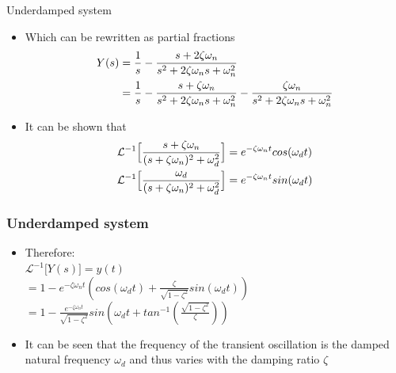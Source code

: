 \begin{frame}{Underdamped system}
\begin{itemize}
\item Which can be rewritten as partial fractions\\
\vspace{-0.5cm}
\begin{align*}
Y(s)&=\frac{1}{s} -\frac{s+2\zeta\omega_n}{s^2+2\zeta\omega_n s+ \omega_n ^2} \\ \vspace{2cm}
&= \frac{1}{s} -\frac{s+\zeta\omega_n}{s^2+2\zeta\omega_n s+ \omega_n ^2} -\frac{\zeta\omega_n}{s^2+2\zeta\omega_n s+ \omega_n ^2}
\end{align*}
\item It can be shown that
\\ 
\begin{align*}
\mathcal{L}^{-1}\Big[\frac{s+\zeta\omega_n}{(s+\zeta\omega_n)^2+\omega_d ^2}\Big]&= e^{-\zeta\omega_n t}cos(\omega_d t)\\  \vspace{2cm}
\mathcal{L}^{-1}\Big[\frac{\omega_d}{(s+\zeta\omega_n)^2+\omega_d ^2}\Big]&= e^{-\zeta\omega_n t}sin(\omega_d t)
\end{align*}
\end{itemize}
\end{frame}



\begin{frame}
\frametitle{Underdamped system}
\begin{itemize}
\item Therefore:\\ 
\vspace{0.25cm}
$\mathcal{L}^{-1}\Big[Y(s)\Big]=y(t)$
\vspace{0.35cm}
\\$ = 1 - e^{-\zeta\omega_n t}(cos(\omega_d t)+\frac{\zeta}{\sqrt{1 - \zeta^2}}sin(\omega_d t))$
\vspace{0.25cm}
\\$ = 1 - \frac{e^{-\zeta\omega_n t}}{\sqrt{1-\zeta^2}}sin(\omega_d t+ tan^{-1}(\frac{\sqrt{1-\zeta^2}}{\zeta}))$
\vspace{0.4cm}
\item It can be seen that the frequency of the transient oscillation is the damped natural frequency $\omega_d$ and thus varies with the damping ratio $\zeta$
\end{itemize}
\end{frame}

